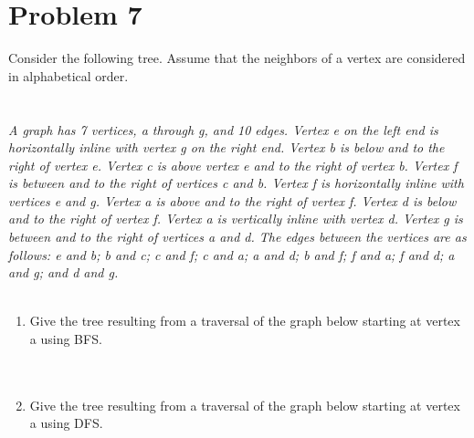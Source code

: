 \documentclass{amsart}
\theoremstyle{definition}
\theoremstyle{Exercise}
\theoremstyle{remark}
\theoremstyle{rule}
\numberwithin{equation}{section}
\begin{document}
\section*{Problem 7}
Consider the following tree. Assume that the neighbors of a vertex are considered in alphabetical order.
\\
\\\\
{\color{blue}{\bf Figure 15:} \emph{A graph has 7 vertices, a through g, and 10 edges. Vertex e on the left end is horizontally inline with vertex g on the right end. Vertex b is below and to the right of vertex e. Vertex c is above vertex e and to the right of vertex b. Vertex f is between and to the right of vertices c and b. Vertex f is horizontally inline with vertices e and g. Vertex a is above and to the right of vertex f. Vertex d is below and to the right of vertex f. Vertex a is vertically inline with vertex d. Vertex g is between and to the right of vertices a and d. The edges between the vertices are as follows: e and b; b and c; c and f; c and a; a and d; b and f; f and a; f and d; a and g; and d and g.
}
}
\\
\\
\begin{enumerate}[label=(\alph*)]
    \item Give the tree resulting from a traversal of the graph below starting at vertex a using BFS. \\\\
\\
    \item Give the tree resulting from a traversal of the graph below starting at vertex a using DFS.\\\\
\end{enumerate}

\newpage
\end{document}
